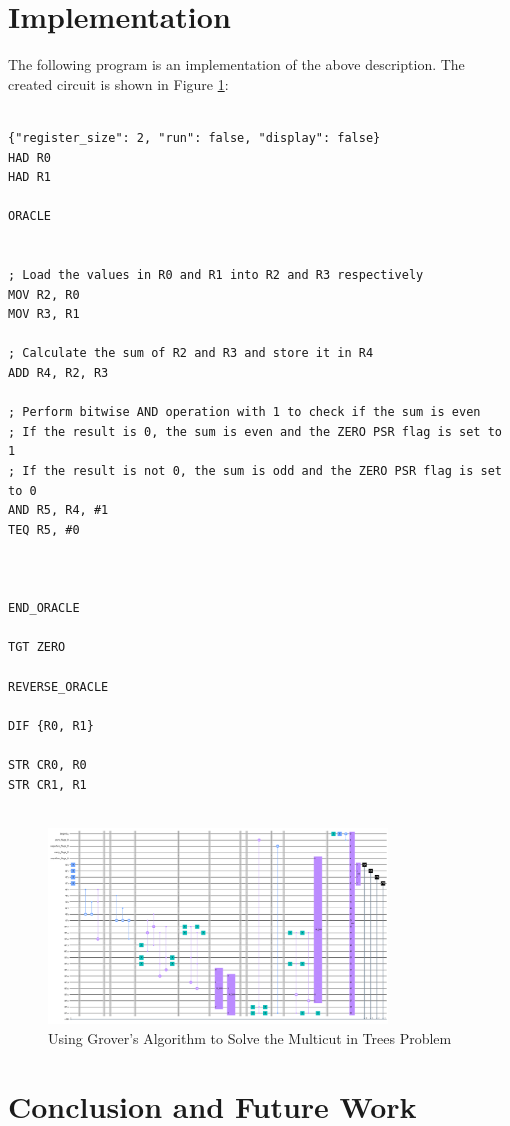 \section{Implementation}

The following program is an implementation of the above description. The created circuit is shown in Figure \ref{fig:Multicut_in_Trees}:

\begin{lstlisting}

{"register_size": 2, "run": false, "display": false}
HAD R0
HAD R1

ORACLE


; Load the values in R0 and R1 into R2 and R3 respectively
MOV R2, R0
MOV R3, R1

; Calculate the sum of R2 and R3 and store it in R4
ADD R4, R2, R3

; Perform bitwise AND operation with 1 to check if the sum is even
; If the result is 0, the sum is even and the ZERO PSR flag is set to 1
; If the result is not 0, the sum is odd and the ZERO PSR flag is set to 0
AND R5, R4, #1
TEQ R5, #0



END_ORACLE

TGT ZERO

REVERSE_ORACLE

DIF {R0, R1}

STR CR0, R0
STR CR1, R1


\end{lstlisting}

\begin{figure}[htp]
    \centering
    \includegraphics[width=9cm]{Figures/Multicut_in_Trees_circuit.png}
    \caption{Using Grover's Algorithm to Solve the Multicut in Trees Problem}
    \label{fig:Multicut_in_Trees}
\end{figure}

\section{Conclusion and Future Work}
\label{sec:conclusion}

